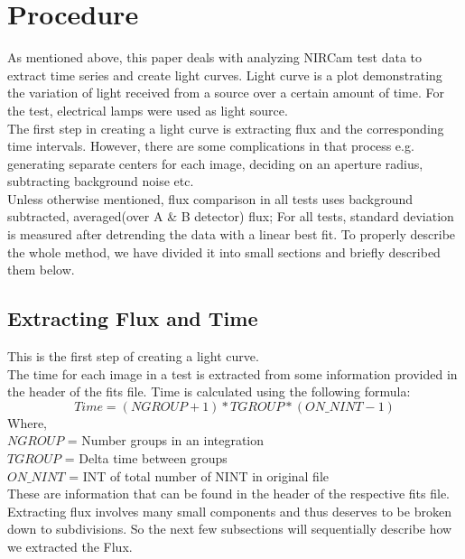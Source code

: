 \documentclass{aastex6}
\begin{document}
\section{Procedure}
As mentioned above, this paper deals with analyzing NIRCam test data to extract time series and create light curves. Light curve is a plot demonstrating the variation of light received from a source over a certain amount of time. For the test, electrical lamps were used as light source.\\
The first step in creating a light curve is extracting flux and the corresponding time intervals. However, there are some complications in that process e.g. generating separate centers for each image, deciding on an aperture radius, subtracting background noise etc. \\
Unless otherwise mentioned, flux comparison in all tests uses background subtracted, averaged(over A \& B detector) flux; For all tests, standard deviation is measured after detrending the data with a linear best fit. To properly describe the whole method, we have divided it into small sections and briefly described them below.   


    \subsection{Extracting Flux and Time}
    This is the first step of creating a light curve.\\
    The time for each image in a test is extracted from some information provided in the header of the fits file. Time is calculated using the following formula:
    $$Time =  (NGROUP  + 1) * TGROUP * (ON\_NINT - 1)$$ 
    Where, \\
    $NGROUP$ = Number groups in an integration\\
    $TGROUP$ = Delta time between groups\\
    $ON\_NINT$ = INT of total number of NINT in original file\\
    These are information that can be found in the header of the respective fits file. \\
    Extracting flux involves many small components and thus deserves to be broken down to subdivisions. So the next few subsections will sequentially describe how we extracted the Flux.
\end{document}

